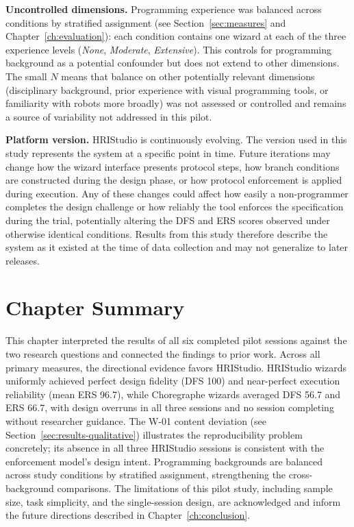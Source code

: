 \textbf{Uncontrolled dimensions.} Programming experience was balanced across conditions by stratified assignment (see Section~\ref{sec:measures} and Chapter~\ref{ch:evaluation}): each condition contains one wizard at each of the three experience levels (\emph{None}, \emph{Moderate}, \emph{Extensive}). This controls for programming background as a potential confounder but does not extend to other dimensions. The small $N$ means that balance on other potentially relevant dimensions (disciplinary background, prior experience with visual programming tools, or familiarity with robots more broadly) was not assessed or controlled and remains a source of variability not addressed in this pilot.

\textbf{Platform version.} HRIStudio is continuously evolving. The version used in this study represents the system at a specific point in time. Future iterations may change how the wizard interface presents protocol steps, how branch conditions are constructed during the design phase, or how protocol enforcement is applied during execution. Any of these changes could affect how easily a non-programmer completes the design challenge or how reliably the tool enforces the specification during the trial, potentially altering the DFS and ERS scores observed under otherwise identical conditions. Results from this study therefore describe the system as it existed at the time of data collection and may not generalize to later releases.

\section{Chapter Summary}

This chapter interpreted the results of all six completed pilot sessions against the two research questions and connected the findings to prior work. Across all primary measures, the directional evidence favors HRIStudio. HRIStudio wizards uniformly achieved perfect design fidelity (DFS 100) and near-perfect execution reliability (mean ERS 96.7), while Choregraphe wizards averaged DFS 56.7 and ERS 66.7, with design overruns in all three sessions and no session completing without researcher guidance. The W-01 content deviation (see Section~\ref{sec:results-qualitative}) illustrates the reproducibility problem concretely; its absence in all three HRIStudio sessions is consistent with the enforcement model's design intent. Programming backgrounds are balanced across study conditions by stratified assignment, strengthening the cross-background comparisons. The limitations of this pilot study, including sample size, task simplicity, and the single-session design, are acknowledged and inform the future directions described in Chapter~\ref{ch:conclusion}.
